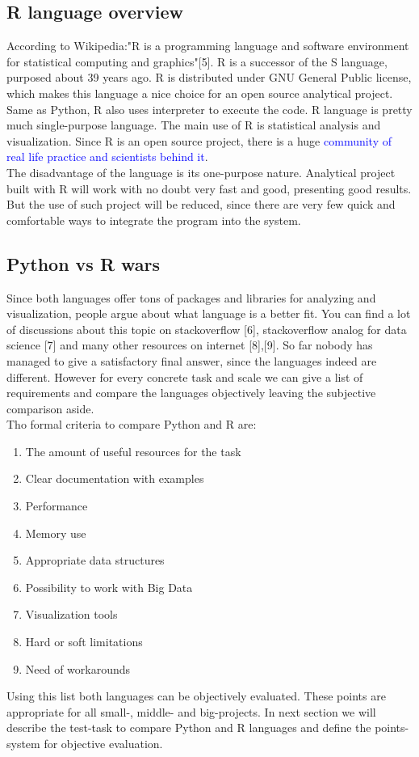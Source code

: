 \documentclass{article}
\begin{document}
\subsection{R language overview}
According to Wikipedia:"R is a programming language and software environment for statistical computing and graphics"[5]. R is a successor of the S language, purposed about 39 years ago. R is distributed under GNU General Public license, which makes this language a nice choice for an open source analytical project.\\
Same as Python, R also uses interpreter to execute the code. R language is pretty much single-purpose language. The main use of R is statistical analysis and visualization. Since R is an open source project, there is a huge \textcolor{blue}{community of real life practice and scientists behind it}.\\
The disadvantage of the language is its one-purpose nature. Analytical project built with R will work with no doubt very fast and good, presenting good results. But the use of such project will be reduced, since there are very few quick and comfortable ways to integrate the program into the system.\\

\subsection{Python vs R wars}
Since both languages offer tons of packages and libraries for analyzing and visualization, people argue about what language is a better fit. You can find a lot of discussions about this topic on stackoverflow [6], stackoverflow analog for data science [7] and many other resources on internet [8],[9].
So far nobody has managed to give a satisfactory final answer, since the languages indeed are different. However for every concrete task and scale we can give a list of requirements and compare the languages objectively leaving the subjective comparison aside.\\
Tho formal criteria to compare Python and R are:
\begin{enumerate}
    \item The amount of useful resources for the task
    \item Clear documentation with examples
    \item Performance
    \item Memory use
    \item Appropriate data structures
    \item Possibility to work with Big Data
    \item Visualization tools
    \item Hard or soft limitations
    \item Need of workarounds
\end{enumerate}
Using this list both languages can be objectively evaluated. These points are appropriate for all small-, middle- and big-projects. In next section we will describe the test-task to compare Python and R languages and define the points-system for objective evaluation.
\end{document}
